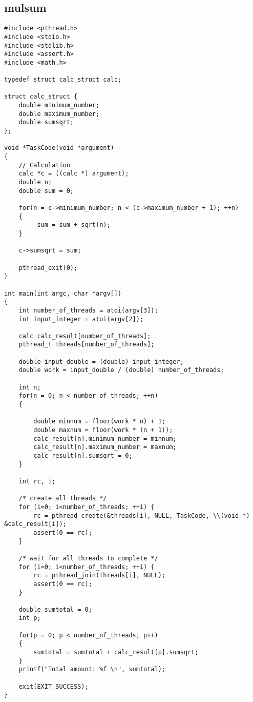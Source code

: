 \subsection{mulsum}
\begin{lstlisting}
#include <pthread.h>
#include <stdio.h>
#include <stdlib.h>
#include <assert.h>
#include <math.h>

typedef struct calc_struct calc;

struct calc_struct {
	double minimum_number;
	double maximum_number;
	double sumsqrt;
};

void *TaskCode(void *argument)
{
	// Calculation
	calc *c = ((calc *) argument);
	double n;
	double sum = 0;
	
	for(n = c->minimum_number; n < (c->maximum_number + 1); ++n)
	{
		 sum = sum + sqrt(n);
	}
	
	c->sumsqrt = sum;
	
	pthread_exit(0);
}

int main(int argc, char *argv[])
{
	int number_of_threads = atoi(argv[3]);
	int input_integer = atoi(argv[2]);

	calc calc_result[number_of_threads];
	pthread_t threads[number_of_threads];

	double input_double = (double) input_integer;
	double work = input_double / (double) number_of_threads;	

	int n;
	for(n = 0; n < number_of_threads; ++n)
	{
		
		double minnum = floor(work * n) + 1;
		double maxnum = floor(work * (n + 1));
		calc_result[n].minimum_number = minnum;
		calc_result[n].maximum_number = maxnum;
		calc_result[n].sumsqrt = 0;	
	}

	int rc, i;

	/* create all threads */
	for (i=0; i<number_of_threads; ++i) {
		rc = pthread_create(&threads[i], NULL, TaskCode, \\(void *) &calc_result[i]);
		assert(0 == rc);
	}
	
	/* wait for all threads to complete */
	for (i=0; i<number_of_threads; ++i) {
		rc = pthread_join(threads[i], NULL);
		assert(0 == rc);
	}

	double sumtotal = 0;
	int p;

	for(p = 0; p < number_of_threads; p++)
	{
		sumtotal = sumtotal + calc_result[p].sumsqrt;
	}
	printf("Total amount: %f \n", sumtotal);
	
	exit(EXIT_SUCCESS);
}

\end{lstlisting}